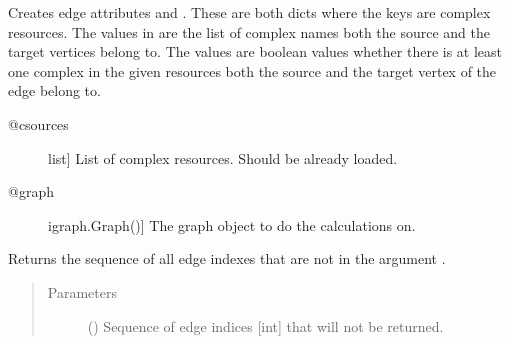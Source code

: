 \documentclass[letterpaper,10pt,english]{sphinxmanual}
\begin{document}
\begin{fulllineitems}
\begin{fulllineitems}
\begin{description}
\end{description}

\end{fulllineitems}


\begin{fulllineitems}
\label{\detokenize{reference:pypath.main.PyPath.edges_in_comlexes}}
Creates edge attributes  and .
These are both dicts where the keys are complex resources.
The values in  are the list of complex names
both the source and the target vertices belong to.
The values  are boolean values whether there
is at least one complex in the given resources both the
source and the target vertex of the edge belong to.
\begin{description}
\item[{@csources}] \leavevmode{[}list{]}
List of complex resources. Should be already loaded.

\item[{@graph}] \leavevmode{[}igraph.Graph(){]}
The graph object to do the calculations on.

\end{description}

\end{fulllineitems}


\begin{fulllineitems}
\label{\detokenize{reference:pypath.main.PyPath.edges_ptms}}
\end{fulllineitems}


\begin{fulllineitems}
\label{\detokenize{reference:pypath.main.PyPath.edgeseq_inverse}}
Returns the sequence of all edge indexes that are not in
the argument .
\begin{quote}\begin{description}
\item[{Parameters}] \leavevmode
{} () \textendash{} Sequence of edge indices {[}int{]} that will not be returned.


\end{description}
\end{quote}
\end{fulllineitems}
\end{fulllineitems}
\end{document}
